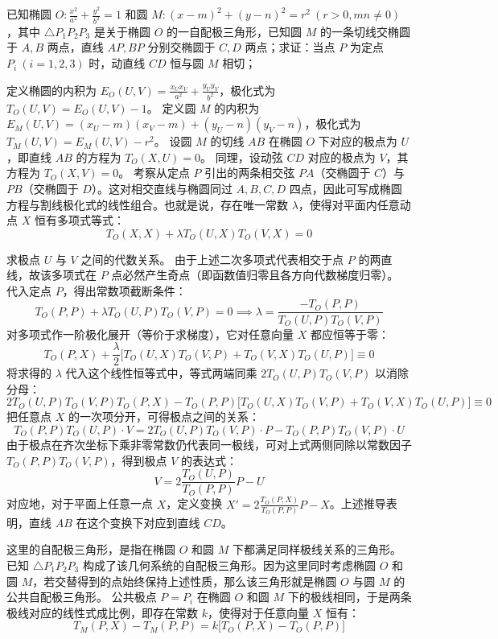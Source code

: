 \begin{exercise}
已知椭圆 \(O: \frac{x^2}{a^2} + \frac{y^2}{b^2} = 1\) 和圆 \(M: (x - m)^2 + (y - n)^2 = r^2\ (r > 0, mn \neq 0)\)，其中 \(\triangle P_1P_2P_3\) 是关于椭圆 \(O\) 的一自配极三角形，已知圆 \(M\) 的一条切线交椭圆于 \(A, B\) 两点，直线 \(AP, BP\) 分别交椭圆于 \(C, D\) 两点；求证：当点 \(P\) 为定点 \(P_i\ (i=1,2,3)\) 时，动直线 \(CD\) 恒与圆 \(M\) 相切；
\end{exercise}
\begin{solution}
定义椭圆的内积为 $E_O(U,V) = \frac{x_U x_V}{a^2} + \frac{y_U y_V}{b^2}$，极化式为 $T_O(U,V) = E_O(U,V) - 1$。
定义圆 $M$ 的内积为 $E_M(U,V) = (x_U - m)(x_V - m) + (y_U - n)(y_V - n)$，极化式为 $T_M(U,V) = E_M(U,V) - r^2$。
设圆 $M$ 的切线 $AB$ 在椭圆 $O$ 下对应的极点为 $U$，即直线 $AB$ 的方程为 $T_O(X,U) = 0$。
同理，设动弦 $CD$ 对应的极点为 $V$，其方程为 $T_O(X,V) = 0$。
考察从定点 $P$ 引出的两条相交弦 $PA$（交椭圆于 $C$）与 $PB$（交椭圆于 $D$）。这对相交直线与椭圆同过 $A,B,C,D$ 四点，因此可写成椭圆方程与割线极化式的线性组合。也就是说，存在唯一常数 $\lambda$，使得对平面内任意动点 $X$ 恒有多项式等式：
$$ T_O(X,X) + \lambda T_O(U,X) T_O(V,X) = 0 $$

求极点 $U$ 与 $V$ 之间的代数关系。
由于上述二次多项式代表相交于点 $P$ 的两直线，故该多项式在 $P$ 点必然产生奇点（即函数值归零且各方向代数梯度归零）。
代入定点 $P$，得出常数项截断条件：
$$ T_O(P,P) + \lambda T_O(U,P) T_O(V,P) = 0 \implies \lambda = \frac{-T_O(P,P)}{T_O(U,P) T_O(V,P)} $$
对多项式作一阶极化展开（等价于求梯度），它对任意向量 $X$ 都应恒等于零：
$$ T_O(P,X) + \frac{\lambda}{2} \Big[ T_O(U,X) T_O(V,P) + T_O(V,X) T_O(U,P) \Big] \equiv 0 $$
将求得的 $\lambda$ 代入这个线性恒等式中，等式两端同乘 $2 T_O(U,P) T_O(V,P)$ 以消除分母：
$$ 2 T_O(U,P) T_O(V,P) T_O(P,X) - T_O(P,P) \Big[ T_O(U,X) T_O(V,P) + T_O(V,X) T_O(U,P) \Big] \equiv 0 $$
把任意点 $X$ 的一次项分开，可得极点之间的关系：
$$ T_O(P,P) T_O(U,P) \cdot V = 2 T_O(U,P) T_O(V,P) \cdot P - T_O(P,P) T_O(V,P) \cdot U $$
由于极点在齐次坐标下乘非零常数仍代表同一极线，可对上式两侧同除以常数因子 $T_O(P,P) T_O(V,P)$，得到极点 $V$ 的表达式：
$$ V = 2 \frac{T_O(U,P)}{T_O(P,P)} P - U $$
对应地，对于平面上任意一点 $X$，定义变换 $X' = 2 \frac{T_O(P,X)}{T_O(P,P)} P - X$。上述推导表明，直线 $AB$ 在这个变换下对应到直线 $CD$。

这里的自配极三角形，是指在椭圆 $O$ 和圆 $M$ 下都满足同样极线关系的三角形。已知 $\triangle P_1 P_2 P_3$ 构成了该几何系统的自配极三角形。因为这里同时考虑椭圆 $O$ 和圆 $M$，若交替得到的点始终保持上述性质，那么该三角形就是椭圆 $O$ 与圆 $M$ 的公共自配极三角形。
公共极点 $P = P_i$ 在椭圆 $O$ 和圆 $M$ 下的极线相同，于是两条极线对应的线性式成比例，即存在常数 $k$，使得对于任意向量 $X$ 恒有：
$$ T_M(P,X) - T_M(P,P) = k \Big[ T_O(P,X) - T_O(P,P) \Big] $$


\end{solution}
